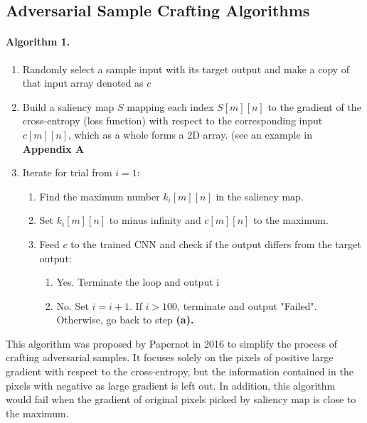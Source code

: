 \documentclass{article}
\begin{document}
\subsection{Adversarial Sample Crafting Algorithms}
\paragraph{Algorithm 1.}
\begin{enumerate}

\item Randomly select a sample input with its target output and make a copy of that input array denoted as $c$

\item Build a saliency map $S$ mapping each index $S[m][n]$ to the gradient of the cross-entropy (loss function) with respect to the corresponding input $c[m][n]$, which as a whole forms a 2D array. (see an example in \textbf{Appendix A}

\item Iterate for trial from $i=1$:

\begin{enumerate}
	\item Find the maximum number $k_i[m][n]$ in the saliency map.

	\item Set $k_i[m][n]$ to minus infinity  and $c[m][n]$ to the maximum.

	\item Feed $c$ to the trained CNN and check if the output differs from the target output:
		\begin{enumerate}
			\item Yes. Terminate the loop and output i
			\item No. Set $i=i+1$. If $i > 100$, terminate and output "Failed". Otherwise, go back to step \textbf{(a).}
		\end{enumerate}
\end{enumerate}
\end{enumerate}

This algorithm was proposed by Papernot\cite{Papernot} in 2016 to simplify the process of crafting adversarial samples. It focuses solely on the pixels of positive large gradient with respect to the cross-entropy, but the information contained in the pixels with negative as large gradient is left out.
In addition, this algorithm would fail when the gradient of original pixels picked by saliency map is close to the maximum.\cite{Papernot2}
\end{document}
